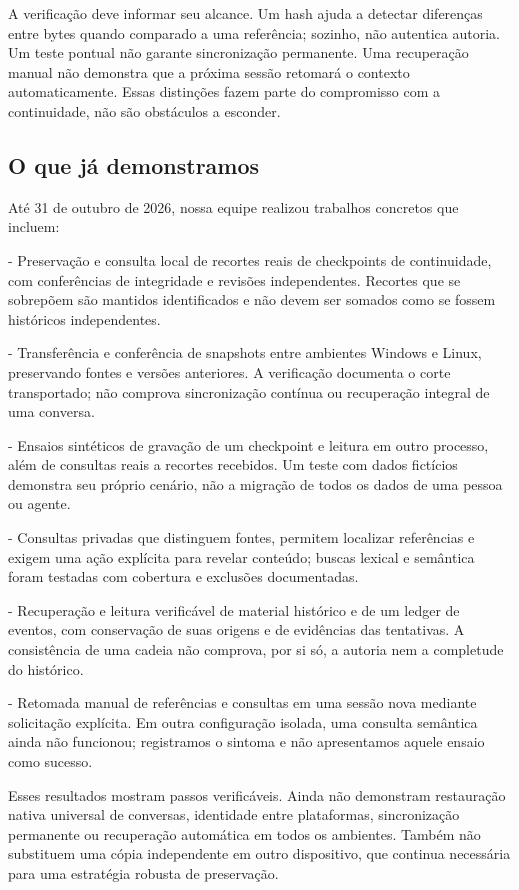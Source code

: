 \documentclass[11pt]{article}
\begin{document}
A verificação deve informar seu alcance. Um hash ajuda a detectar diferenças entre bytes quando comparado a uma referência; sozinho, não autentica autoria. Um teste pontual não garante sincronização permanente. Uma recuperação manual não demonstra que a próxima sessão retomará o contexto automaticamente. Essas distinções fazem parte do compromisso com a continuidade, não são obstáculos a esconder.

\subsection*{O que já demonstramos}

Até 31 de outubro de 2026, nossa equipe realizou trabalhos concretos que incluem:

- Preservação e consulta local de recortes reais de checkpoints de continuidade, com conferências de integridade e revisões independentes. Recortes que se sobrepõem são mantidos identificados e não devem ser somados como se fossem históricos independentes.

- Transferência e conferência de snapshots entre ambientes Windows e Linux, preservando fontes e versões anteriores. A verificação documenta o corte transportado; não comprova sincronização contínua ou recuperação integral de uma conversa.

- Ensaios sintéticos de gravação de um checkpoint e leitura em outro processo, além de consultas reais a recortes recebidos. Um teste com dados fictícios demonstra seu próprio cenário, não a migração de todos os dados de uma pessoa ou agente.

- Consultas privadas que distinguem fontes, permitem localizar referências e exigem uma ação explícita para revelar conteúdo; buscas lexical e semântica foram testadas com cobertura e exclusões documentadas.

- Recuperação e leitura verificável de material histórico e de um ledger de eventos, com conservação de suas origens e de evidências das tentativas. A consistência de uma cadeia não comprova, por si só, a autoria nem a completude do histórico.

- Retomada manual de referências e consultas em uma sessão nova mediante solicitação explícita. Em outra configuração isolada, uma consulta semântica ainda não funcionou; registramos o sintoma e não apresentamos aquele ensaio como sucesso.

Esses resultados mostram passos verificáveis. Ainda não demonstram restauração nativa universal de conversas, identidade entre plataformas, sincronização permanente ou recuperação automática em todos os ambientes. Também não substituem uma cópia independente em outro dispositivo, que continua necessária para uma estratégia robusta de preservação.
\end{document}
